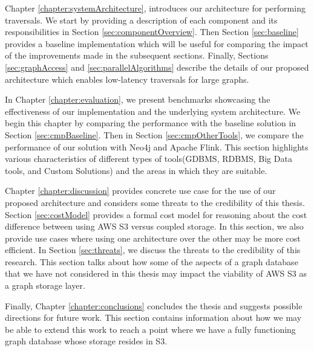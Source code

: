 \medskip
Chapter \ref{chapter:systemArchitecture}, introduces our architecture for
performing traversals. We start by providing a description of each component and
its responsibilities in Section \ref{sec:componentOverview}. 
Then Section \ref{sec:baseline} provides a baseline implementation which will be useful for comparing
the impact of the improvements made in the subsequent sections. Finally, 
Sections \ref{sec:graphAccess} and \ref{sec:parallelAlgorithms} 
describe the details of our proposed architecture
which enables low-latency traversals for large graphs.

\medskip
In Chapter \ref{chapter:evaluation}, we present benchmarks showcasing the
effectiveness of our implementation and the underlying system architecture. We begin this chapter by
comparing the performance with the baseline solution in
Section \ref{sec:cmpBaseline}. Then in Section \ref{sec:cmpOtherTools}, we
compare the performance of our solution with Neo4j and Apache Flink. This
section highlights various characteristics of different types of tools(GDBMS,
RDBMS, Big Data tools, and Custom Solutions) and the areas in which they 
are suitable. 

\medskip
Chapter \ref{chapter:discussion} provides concrete use case for the use of our
proposed architecture and considers some threats to the credibility of this
thesis. Section \ref{sec:costModel} provides a formal cost model for reasoning
about the cost difference between using AWS S3 versus coupled storage. In this
section, we also provide use cases where using one architecture over the other
may be more cost efficient. In Section \ref{sec:threats}, we discuss the threats
to the credibility of this research. This section talks about how some of the
aspects of a graph database that we have not considered in this thesis may
impact the viability of AWS S3 as a graph storage layer. 

\medskip
Finally, Chapter \ref{chapter:conclusions} concludes the thesis and
suggests possible directions for future work. This section contains information
about how we may be able to extend this work to reach a point where we have a
fully functioning graph database whose storage resides in S3.
